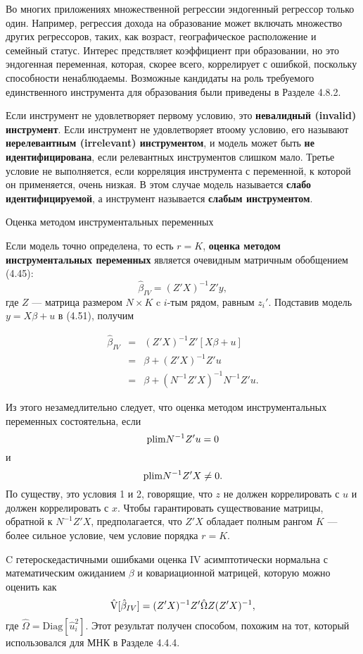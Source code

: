 Во многих приложениях множественной регрессии эндогенный регрессор только один. Например, регрессия дохода на образование  может включать множество других регрессоров, таких, как возраст, географическое расположение и семейный статус. Интерес предствляет коэффициент при образовании, но это эндогенная переменная, которая, скорее всего, коррелирует с ошибкой, поскольку способности ненаблюдаемы. Возможные кандидаты на роль требуемого единственного инструмента для образования были приведены в Разделе 4.8.2.

Если инструмент не удовлетворяет первому условию, это \textbf{невалидный (invalid) инструмент}. Если инструмент не удовлетворяет втоому условию, его называют \textbf{нерелевантным (irrelevant) инструментом}, и модель может быть \textbf{не идентифицирована}, если релевантных инструментов слишком мало.  Третье условие не выполняется, если корреляция инструмента с переменной, к которой он применяется, очень низкая. В этом случае модель называется \textbf{слабо идентифицируемой}, а инструмент называется \textbf{слабым инструментом}.
\begin{center}
Оценка методом инструментальных переменных
\end{center}
Если модель точно определена, то есть $r=K$, \textbf{оценка методом инструментальных переменных} является очевидным матричным обобщением (4.45):
\begin{equation}
\hat{\beta}_{IV} = (Z'X)^{-1}Z'y, 
\end{equation}
где $Z$ --- матрица размером $N\times K$ c $i$-тым рядом, равным $z_i'$. Подставив модель $y = X\beta+u$ в (4.51), получим

\[
\begin{array}{rcl}
\hat{\beta}_{IV} & = & (Z'X)^{-1} Z'[X\beta +u] \\
& = & \beta + (Z'X)^{-1} Z'u \\
& = & \beta + (N^{-1}Z'X)^{-1} N^{-1}Z'u.
\end{array}
\]

Из этого незамедлительно следует, что оценка методом инструментальных переменных состоятельна, если 
$$
\mathrm{plim } N^{-1}Z'u = 0
$$
и
$$
\mathrm{plim } N^{-1}Z'X \neq 0.
$$
По существу, это условия 1 и 2, говорящие, что $z$ не должен коррелировать с $u$ и должен коррелировать с $x$. Чтобы гарантировать существование матрицы, обратной к 	$N^{-1}Z'X$, предполагается, что $Z'X$ обладает полным рангом $K$ --- более сильное условие, чем условие порядка $r=K$.

C гетероскедастичными ошибками оценка IV асимптотически нормальна с математическим ожиданием $\beta$ и ковариационной матрицей, которую можно оценить как
\begin{equation}
\hat{\mathrm{V}}[\hat{\beta}_{IV}] = (Z'X)^{-1} Z'\hat{\Omega}Z(Z'X)^{-1},
\end{equation}
где $\hat{\Omega} = \mathrm{Diag}[\hat{u}_i^2]$. Этот результат получен способом, похожим на тот, который использовался для МНК в Разделе 4.4.4.

